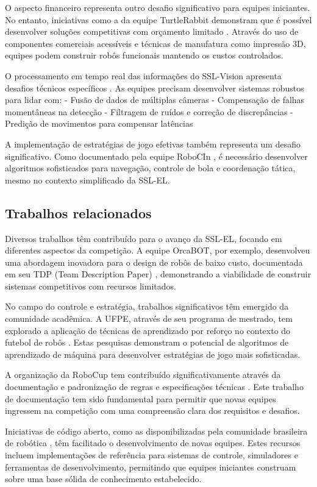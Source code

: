 O aspecto financeiro representa outro desafio significativo para equipes iniciantes. No entanto, iniciativas como a da equipe TurtleRabbit demonstram que é possível desenvolver soluções competitivas com orçamento limitado \cite{https://ssl.robocup.org/wp-content/uploads/2024/04/2024_TDP_turtlerabbit.pdf}. Através do uso de componentes comerciais acessíveis e técnicas de manufatura como impressão 3D, equipes podem construir robôs funcionais mantendo os custos controlados.

O processamento em tempo real das informações do SSL-Vision apresenta desafios técnicos específicos \cite{https://ssl.robocup.org/technical-overview-of-the-small-size-league/}. As equipes precisam desenvolver sistemas robustos para lidar com:
- Fusão de dados de múltiplas câmeras
- Compensação de falhas momentâneas na detecção
- Filtragem de ruídos e correção de discrepâncias
- Predição de movimentos para compensar latências

A implementação de estratégias de jogo efetivas também representa um desafio significativo. Como documentado pela equipe RoboCIn \cite{https://ssl.robocup.org/wp-content/uploads/2024/04/2024_ETDP_RoboCIn.pdf}, é necessário desenvolver algoritmos sofisticados para navegação, controle de bola e coordenação tática, mesmo no contexto simplificado da SSL-EL.

\subsection{Trabalhos relacionados}
\label{subsec:futebol_trabalhos}

Diversos trabalhos têm contribuído para o avanço da SSL-EL, focando em diferentes aspectos da competição. A equipe OrcaBOT, por exemplo, desenvolveu uma abordagem inovadora para o design de robôs de baixo custo, documentada em seu TDP (Team Description Paper) \cite{https://ssl.robocup.org/wp-content/uploads/2024/04/2024_TDP_OrcaBOT.pdf}, demonstrando a viabilidade de construir sistemas competitivos com recursos limitados.

No campo do controle e estratégia, trabalhos significativos têm emergido da comunidade acadêmica. A UFPE, através de seu programa de mestrado, tem explorado a aplicação de técnicas de aprendizado por reforço no contexto do futebol de robôs \cite{https://www.youtube.com/watch?v=GCwrTJuuJ3w}. Estas pesquisas demonstram o potencial de algoritmos de aprendizado de máquina para desenvolver estratégias de jogo mais sofisticadas.

A organização da RoboCup tem contribuído significativamente através da documentação e padronização de regras e especificações técnicas \cite{https://robocup-ssl.github.io/ssl-rules/sslrules.html}. Este trabalho de documentação tem sido fundamental para permitir que novas equipes ingressem na competição com uma compreensão clara dos requisitos e desafios.

Iniciativas de código aberto, como as disponibilizadas pela comunidade brasileira de robótica \cite{https://github.com/robocup-ssl-br}, têm facilitado o desenvolvimento de novas equipes. Estes recursos incluem implementações de referência para sistemas de controle, simuladores e ferramentas de desenvolvimento, permitindo que equipes iniciantes construam sobre uma base sólida de conhecimento estabelecido.